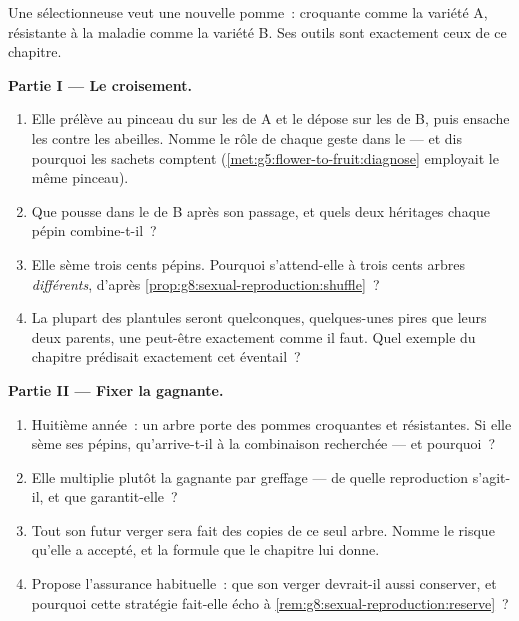 \begin{problem}\label{pb:g8:sexual-reproduction:1}
Une sélectionneuse veut une nouvelle pomme~: croquante comme la
variété A, résistante à la maladie comme la variété B. Ses outils
sont exactement ceux de ce chapitre.

\medskip\noindent\textbf{Partie I --- Le croisement.}
\begin{enumerate}
  \item Elle prélève au pinceau du  sur les  de A et
        le dépose sur les  de B, puis ensache les 
        contre les abeilles. Nomme le rôle de chaque geste dans le
         --- et dis pourquoi les sachets comptent
        (\cref{met:g5:flower-to-fruit:diagnose} employait le même
        pinceau).
  \item Que pousse dans le  de B après son passage, et quels
        deux héritages chaque pépin combine-t-il~?
  \item Elle sème trois cents pépins. Pourquoi s'attend-elle à trois
        cents arbres \emph{différents}, d'après
        \cref{prop:g8:sexual-reproduction:shuffle}~?
  \item La plupart des plantules seront quelconques, quelques-unes
        pires que leurs deux parents, une peut-être exactement
        comme il faut. Quel exemple du chapitre prédisait
        exactement cet éventail~?
\end{enumerate}

\medskip\noindent\textbf{Partie II --- Fixer la gagnante.}
\begin{enumerate}[resume]
  \item Huitième année~: un arbre porte des pommes croquantes et
        résistantes. Si elle sème ses pépins, qu'arrive-t-il à la
        combinaison recherchée --- et pourquoi~?
  \item Elle multiplie plutôt la gagnante par greffage --- de
        quelle reproduction s'agit-il, et que garantit-elle~?
  \item Tout son futur verger sera fait des copies de ce seul
        arbre. Nomme le risque qu'elle a accepté, et la formule que
        le chapitre lui donne.
  \item Propose l'assurance habituelle~: que son verger devrait-il
        aussi conserver, et pourquoi cette stratégie fait-elle écho
        à \cref{rem:g8:sexual-reproduction:reserve}~?
\end{enumerate}


\end{problem}
